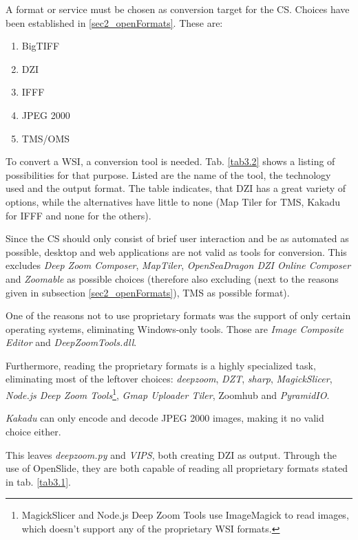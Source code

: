 A format or service must be chosen as conversion target for the CS. Choices have been established in \ref{sec2_openFormats}. These are:
\begin{enumerate}[(1)]
	\item BigTIFF
	\item DZI
	\item IFFF
	\item JPEG 2000
	\item TMS/OMS
\end{enumerate}

To convert a WSI, a conversion tool is needed. Tab. \ref{tab3.2} shows a listing of possibilities for that purpose. Listed are the name of the tool, the technology used and the output format. The table indicates, that DZI has a great variety of options, while the alternatives have little to none (Map Tiler for TMS, Kakadu for IFFF and none for the others).

Since the CS should only consist of brief user interaction and be as automated as possible, desktop and web applications are not valid as tools for conversion. This excludes \emph{Deep Zoom Composer}, \emph{MapTiler}, \emph{OpenSeaDragon DZI Online Composer} and \emph{Zoomable} as possible choices (therefore also excluding (next to the reasons given in subsection \ref{sec2_openFormats}), TMS as possible format).

One of the reasons not to use proprietary formats was the support of only certain operating systems, eliminating Windows-only tools. Those are \emph{Image Composite Editor} and \emph{DeepZoomTools.dll}.

Furthermore, reading the proprietary formats is a highly specialized task, eliminating most of the leftover choices: \emph{deepzoom}\cite{web:deepzoom}, \emph{DZT}\cite{web:dzt}, \emph{sharp}\cite{web:sharp}, \emph{MagickSlicer}, \emph{Node.js Deep Zoom Tools}\footnote{MagickSlicer and Node.js Deep Zoom Tools use ImageMagick to read images, which doesn't support any of the proprietary WSI formats\cite{web:imagemagick}.}, \emph{Gmap Uploader Tiler}\cite{web:gmap}, Zoomhub\cite{web:zoomhub} and \emph{PyramidIO}\cite{web:pyramidio}.

\emph{Kakadu} can only encode and decode JPEG 2000 images\cite{web:openseadragon}, making it no valid choice either.

This leaves \emph{deepzoom.py} and \emph{VIPS}, both creating DZI as output. Through the use of OpenSlide, they are both capable of reading all proprietary formats stated in tab. \ref{tab3.1}\cite{web:openslide}.


